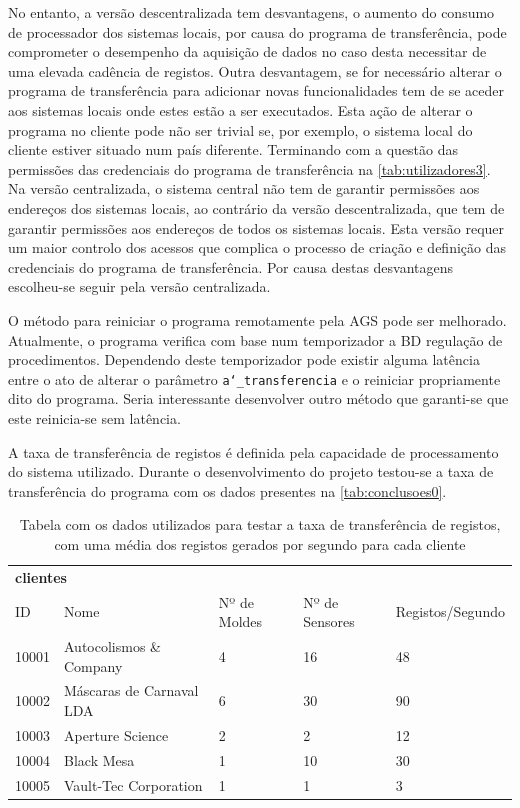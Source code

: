 \documentclass[11pt,twoside,a4paper]{report}
\begin{document}
No entanto, a versão descentralizada tem desvantagens, o aumento do consumo de processador dos sistemas locais, por causa do programa de transferência, pode comprometer o desempenho da aquisição de dados no caso desta necessitar de uma elevada cadência de registos. Outra desvantagem, se for necessário alterar o programa de transferência para adicionar novas funcionalidades tem de se aceder aos sistemas locais onde estes estão a ser executados. Esta ação de alterar o programa no cliente pode não ser trivial se, por exemplo, o sistema local do cliente estiver situado num país diferente. Terminando com a questão das permissões das credenciais do programa de transferência na \autoref{tab:utilizadores3}. Na versão centralizada, o sistema central não tem de garantir permissões aos endereços dos sistemas locais, ao contrário da versão descentralizada, que tem de garantir permissões aos endereços de todos os sistemas locais. Esta versão requer um maior controlo dos acessos que complica o processo de criação e definição das credenciais do programa de transferência. Por causa destas desvantagens escolheu-se seguir pela versão centralizada.\par 
O método para reiniciar o programa remotamente pela AGS pode ser melhorado. Atualmente, o programa verifica com base num temporizador a BD regulação de procedimentos. Dependendo deste temporizador pode existir alguma latência entre o ato de alterar o parâmetro \texttt{a\char`_transferencia} e o reiniciar propriamente dito do programa. Seria interessante desenvolver outro método que garanti-se que este reinicia-se sem latência.\par 
A taxa de transferência de registos é definida pela capacidade de processamento do sistema utilizado. Durante o desenvolvimento do projeto testou-se a taxa de transferência do programa com os dados presentes na \autoref{tab:conclusoes0}.
\begin{table}[H]
	\centering
	\begin{tabular}{|l|l|l|l|l|}
		\multicolumn{5}{l}{\textbf{clientes}}\\ \cline{1-5}
		ID & Nome & Nº de Moldes & Nº de Sensores & Registos/Segundo\\ \cline{1-5}
		10001 & Autocolismos \& Company & 4 & 16 & 48 \\ \cline{1-5}
		10002 & Máscaras de Carnaval LDA & 6 & 30 & 90 \\ \cline{1-5}
		10003 & Aperture Science & 2 & 2 & 12 \\ \cline{1-5}
		10004 & Black Mesa & 1 & 10 & 30 \\ \cline{1-5}
		10005 & Vault-Tec Corporation & 1 & 1 & 3 \\ \cline{1-5}
	\end{tabular}
	\caption[Tabela com os dados utilizados para testar a taxa de transferência de registos]{Tabela com os dados utilizados para testar a taxa de transferência de registos, com uma média dos registos gerados por segundo para cada cliente}
	\label{tab:conclusoes0}
\end{table}
\end{document}
